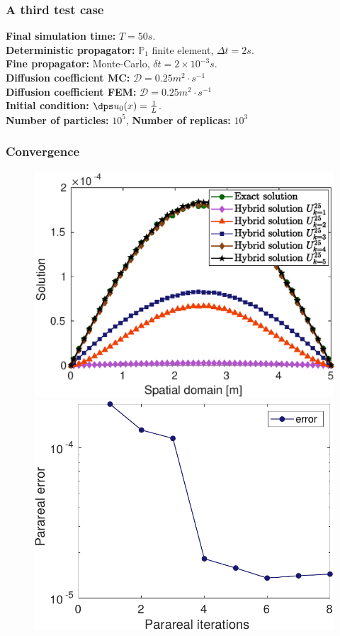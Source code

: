 \documentclass[aspectratio=169]{beamer}
\begin{document}
%
\begin{frame}
  \frametitle{A third test case}
  \textbf{Final simulation time:} $T=50 s$.
\\
\vspace{0.3 cm}
\textbf{Deterministic propagator:} $\mathbb{P}_1$ finite element, $\Delta t = 2 s$.
\\
\vspace{0.3 cm}
\textbf{Fine propagator:} Monte-Carlo, $\delta t = 2 \times 10^{-3} s$.
\\
\vspace{0.3 cm}
\textbf{Diffusion coefficient MC:} $\mathcal{D} = 0.25 m^2 \cdot s^{-1}$
\\
\vspace{0.3 cm}
\textbf{Diffusion coefficient FEM:} $\mathcal{D}=0.25 m^2 \cdot s^{-1}$
\\
\vspace{0.3 cm}
\textbf{Initial condition:} $\dps u_0(x)=\frac{1}{L}$.
\\
\vspace{0.3 cm}
\textbf{Number of particles:} $10^5$, \textbf{Number of replicas:} $10^3$
\end{frame}
\begin{frame}
\frametitle{Convergence}
  \begin{figure}[H]
\centering
\includegraphics[width = 0.49 \textwidth]{image/Solution_n25bis}
\quad
\includegraphics[width = 0.47 \textwidth]{image/parareal_cv_n_25}
\end{figure}
\end{frame}
%
\end{document}

